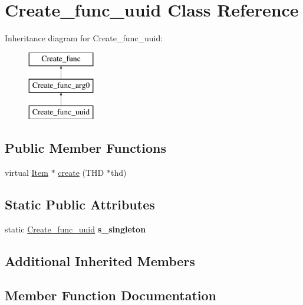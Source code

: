 \hypertarget{classCreate__func__uuid}{}\section{Create\+\_\+func\+\_\+uuid Class Reference}
\label{classCreate__func__uuid}
Inheritance diagram for Create\+\_\+func\+\_\+uuid\+:\begin{figure}[H]
\begin{center}
\leavevmode
\includegraphics[height=3.000000cm]{classCreate__func__uuid}
\end{center}
\end{figure}
\subsection*{Public Member Functions}
\begin{DoxyCompactItemize}
\item 
virtual \mbox{\hyperlink{classItem}{Item}} $\ast$ \mbox{\hyperlink{classCreate__func__uuid_a41dab2a321c6cd48b98fe45ecb49866b}{create}} (T\+HD $\ast$thd)
\end{DoxyCompactItemize}
\subsection*{Static Public Attributes}
\begin{DoxyCompactItemize}
\item 
\mbox{\label{classCreate__func__uuid_aa54e86901c1fdcfe375c0855e6c9c8ad}} 
static \mbox{\hyperlink{classCreate__func__uuid}{Create\+\_\+func\+\_\+uuid}} {\bfseries s\+\_\+singleton}
\end{DoxyCompactItemize}
\subsection*{Additional Inherited Members}


\subsection{Member Function Documentation}
\mbox{\label{classCreate__func__uuid_a41dab2a321c6cd48b98fe45ecb49866b}} 
